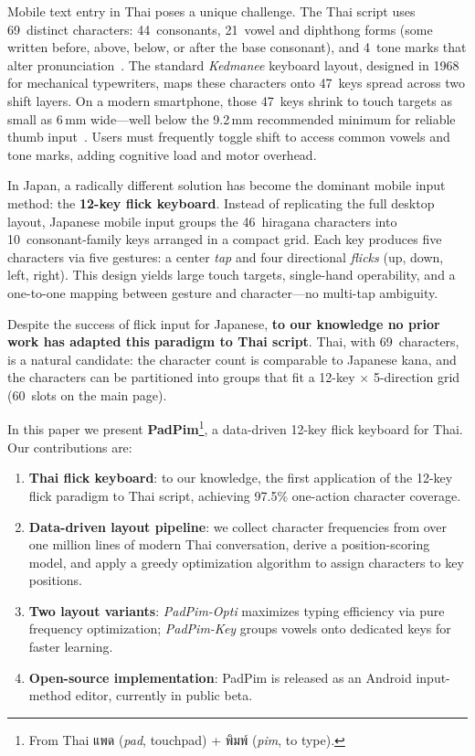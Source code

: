 \documentclass[10pt,twocolumn,a4paper]{article}
\newcommand{\thai}[1]{{\thaifont #1}}
\begin{document}
Mobile text entry in Thai poses a unique challenge.
The Thai script uses 69~distinct characters: 44~consonants, 21~vowel and diphthong forms (some written before, above, below, or after the base consonant), and 4~tone marks that alter pronunciation~\cite{aroonmanakun2002}.
The standard \emph{Kedmanee} keyboard layout, designed in 1968 for mechanical typewriters, maps these characters onto 47~keys spread across two shift layers.
On a modern smartphone, those 47~keys shrink to touch targets as small as 6\,mm wide---well below the 9.2\,mm recommended minimum for reliable thumb input~\cite{bergstrom2014}.
Users must frequently toggle shift to access common vowels and tone marks, adding cognitive load and motor overhead.

In Japan, a radically different solution has become the dominant mobile input method: the \textbf{12-key flick keyboard}.
Instead of replicating the full desktop layout, Japanese mobile input groups the 46~hiragana characters into 10~consonant-family keys arranged in a compact grid.
Each key produces five characters via five gestures: a center \emph{tap} and four directional \emph{flicks} (up, down, left, right).
This design yields large touch targets, single-hand operability, and a one-to-one mapping between gesture and character---no multi-tap ambiguity.

Despite the success of flick input for Japanese, \textbf{to our knowledge no prior work has adapted this paradigm to Thai script}.
Thai, with 69~characters, is a natural candidate: the character count is comparable to Japanese kana, and the characters can be partitioned into groups that fit a 12-key $\times$ 5-direction grid (60~slots on the main page).

In this paper we present \textbf{PadPim}\footnote{From Thai \thai{แพด} (\emph{pad}, touchpad) + \thai{พิมพ์} (\emph{pim}, to type).}, a data-driven 12-key flick keyboard for Thai.
Our contributions are:

\begin{enumerate}
  \item \textbf{Thai flick keyboard}: to our knowledge, the first application of the 12-key flick paradigm to Thai script, achieving 97.5\% one-action character coverage.
  \item \textbf{Data-driven layout pipeline}: we collect character frequencies from over one million lines of modern Thai conversation, derive a position-scoring model, and apply a greedy optimization algorithm to assign characters to key positions.
  \item \textbf{Two layout variants}: \emph{PadPim-Opti} maximizes typing efficiency via pure frequency optimization; \emph{PadPim-Key} groups vowels onto dedicated keys for faster learning.
  \item \textbf{Open-source implementation}: PadPim is released as an Android input-method editor, currently in public beta.
\end{enumerate}
\end{document}
